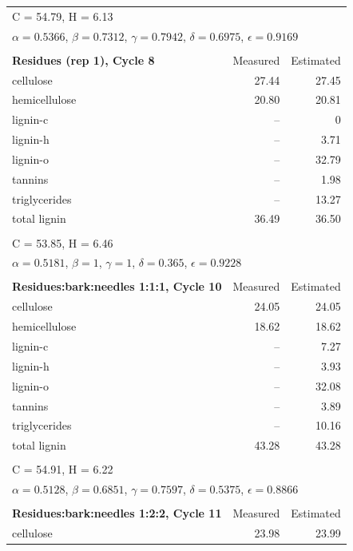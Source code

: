 \begin{longtable}{p{8cm}rr}
    \multicolumn{3}{l}{C = 54.79, H = 6.13} \\
    \multicolumn{3}{l}{$\alpha = 0.5366$, $\beta = 0.7312$, $\gamma = 0.7942$, $\delta = 0.6975$, $\epsilon = 0.9169$} \\
    \\
    \textbf{Residues (rep 1), Cycle 8} & Measured & Estimated \\
    \midrule
    cellulose     & 27.44 & 27.45 \\
    hemicellulose & 20.80 & 20.81 \\
    lignin-c      & --    & 0 \\
    lignin-h      & --    & 3.71 \\
    lignin-o      & --    & 32.79 \\
    tannins       & --    & 1.98 \\
    triglycerides & --    & 13.27 \\
    total lignin  & 36.49 & 36.50 \\
    \\
    \multicolumn{3}{l}{C = 53.85, H = 6.46} \\
    \multicolumn{3}{l}{$\alpha = 0.5181$, $\beta = 1$, $\gamma = 1$, $\delta = 0.365$, $\epsilon = 0.9228$} \\
    \\
    \textbf{Residues:bark:needles 1:1:1, Cycle 10} & Measured & Estimated \\
    \midrule
    cellulose     & 24.05 & 24.05 \\
    hemicellulose & 18.62 & 18.62 \\
    lignin-c      & --    & 7.27 \\
    lignin-h      & --    & 3.93 \\
    lignin-o      & --    & 32.08 \\
    tannins       & --    & 3.89 \\
    triglycerides & --    & 10.16 \\
    total lignin  & 43.28 & 43.28 \\
    \\
    \multicolumn{3}{l}{C = 54.91, H = 6.22} \\
    \multicolumn{3}{l}{$\alpha = 0.5128$, $\beta = 0.6851$, $\gamma = 0.7597$, $\delta = 0.5375$, $\epsilon = 0.8866$} \\
    \\
    \textbf{Residues:bark:needles 1:2:2, Cycle 11} & Measured & Estimated \\
    \midrule
    cellulose     & 23.98 & 23.99 \\

\end{longtable}
